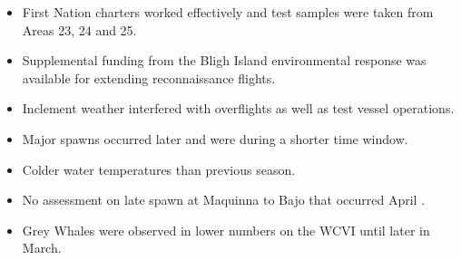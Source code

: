 \begin{itemize}
\item First Nation charters worked effectively and test samples were taken from Areas 23, 24 and 25.
\item Supplemental funding from the Bligh Island environmental response was available for extending reconnaissance flights.
\item Inclement weather interfered with overflights as well as test vessel operations.
\item Major spawns occurred later and were during a shorter time window.
\item Colder water temperatures than previous season.
\item No assessment on late spawn at Maquinna to Bajo that occurred April .
\item Grey Whales were observed in lower numbers on the WCVI until later in March.
\end{itemize}